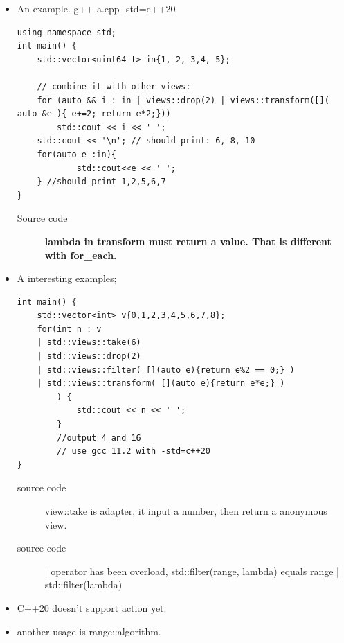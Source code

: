 \documentclass[a4paper,11pt,twoside]{book}
\begin{document}
\begin{itemize}
\begin{lstlisting}
std::basic_istream_view, std::istream_view   
// applies operator>> on the view

std::elements_view, std::views::elements     
// creates a view on the N-th element of tuples

std::keys_view, std::views::keys             
// creates a view on the first element of a pair-like values

std::values_view, std::views::values         
// creates a view on the second elements of a pair-like values
\end{lstlisting}


\item An example. g++ a.cpp -std=c++20

\begin{lstlisting}
using namespace std;
int main() {
    std::vector<uint64_t> in{1, 2, 3,4, 5};

    // combine it with other views:
    for (auto && i : in | views::drop(2) | views::transform([]( auto &e ){ e+=2; return e*2;}))
        std::cout << i << ' ';
    std::cout << '\n'; // should print: 6, 8, 10
	for(auto e :in){
			std::cout<<e << ' ';
	} //should print 1,2,5,6,7
}
\end{lstlisting}
\begin{description}
		\item[Source code] \textbf{lambda in transform must return a value. That is different with for\_each.} 
\end{description}

	\item A interesting examples;
\begin{lstlisting}
int main() {
	std::vector<int> v{0,1,2,3,4,5,6,7,8};
	for(int n : v   
	| std::views::take(6)
	| std::views::drop(2)
	| std::views::filter( [](auto e){return e%2 == 0;} )
	| std::views::transform( [](auto e){return e*e;} )
		) {
			std::cout << n << ' ';
		}
		//output 4 and 16
		// use gcc 11.2 with -std=c++20
}
\end{lstlisting}	

\begin{description}
	\item[source code] view::take is adapter, it input a number, then return a anonymous view.
	\item[source code] | operator has been overload, std::filter(range, lambda) equals range | std::filter(lambda)
\end{description}
	\item C++20 doesn't support action yet. 
	\item another usage is range::algorithm. 


\end{itemize}
\end{document}
